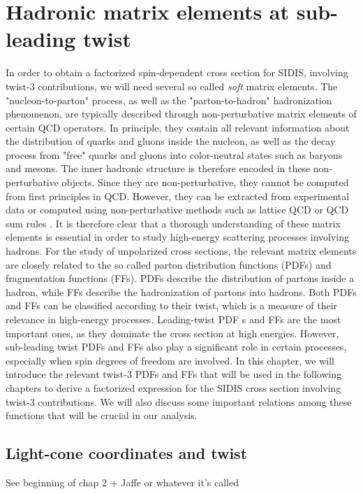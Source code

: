 \chapter{Hadronic matrix elements at sub-leading twist}\label{chap:matrixelements}
In order to obtain a factorized spin-dependent cross section for SIDIS, involving twist-3 contributions, we will need several so called \textit{soft} matrix elements. The "nucleon-to-parton" process, as well as the "parton-to-hadron" hadronization phenomenon, are typically described through non-perturbative matrix elements of certain QCD operators. In principle, they contain all relevant information about the distribution of quarks and gluons inside the nucleon, as well as the decay process from "free" quarks and gluons into color-neutral states such as baryons and mesons. The inner hadronic structure is therefore encoded in these non-perturbative objects. Since they are non-perturbative, they cannot be computed from first principles in QCD. However, they can be extracted from experimental data \cite{} or computed using non-perturbative methods such as lattice QCD or QCD sum rules \cite{}. It is therefore clear that a thorough understanding of these matrix elements is essential in order to study high-energy scattering processes involving hadrons.
For the study of unpolarized cross sections, the relevant matrix elements are closely related to the so called parton distribution functions (PDFs) and fragmentation functions (FFs). PDFs describe the distribution of partons inside a hadron, while FFs describe the hadronization of partons into hadrons. Both PDFs and FFs can be classified according to their twist, which is a measure of their relevance in high-energy processes. Leading-twist PDF s and FFs are the most important ones, as they dominate the cross section at high energies. However, sub-leading twist PDFs and FFs also play a significant role in certain processes, especially when spin degrees of freedom are involved. In this chapter, we will introduce the relevant twist-3 PDFs and FFs that will be used in the following chapters to derive a factorized expression for the SIDIS cross section involving twist-3 contributions. We will also discuss some important relations among these functions that will be crucial in our analysis.

\section{Light-cone coordinates and twist}
See beginning of chap 2 + Jaffe or whatever it's called

